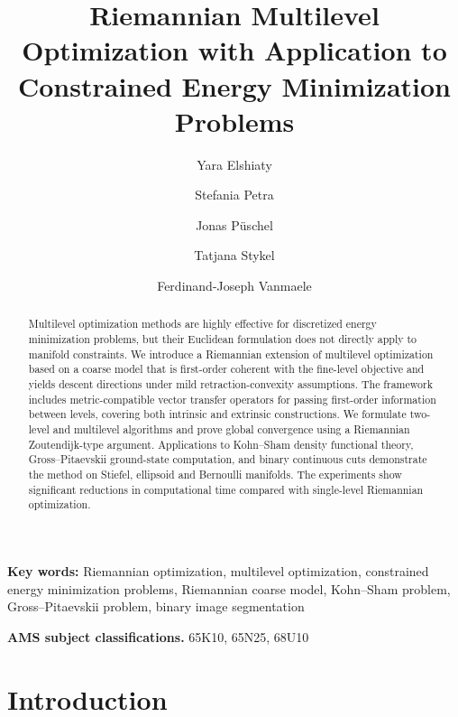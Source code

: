 \documentclass[11pt,reqno]{amsart}
\title[]{Riemannian Multilevel Optimization with Application to 
	Constrained Energy Minimization Problems}
\author[Y. Elshiaty]{Yara Elshiaty}
\author[S. Petra]{Stefania Petra}
\author[J. P\"uschel]{Jonas P\"uschel}
\author[T. Stykel]{Tatjana Stykel}
\author[F.-J. Vanmaele]{Ferdinand-Joseph Vanmaele}
\theoremstyle{plain}
\begin{document}
	
	\begin{abstract}
		Multilevel optimization methods are highly effective for discretized energy minimization problems, but their Euclidean formulation does not directly apply to manifold constraints. We introduce a Riemannian extension of multilevel optimization based on a  coarse model that is first-order coherent with the fine-level objective and yields descent directions under mild retraction-convexity assumptions. The framework includes metric-compatible vector transfer operators for passing first-order information between levels, covering both intrinsic and extrinsic constructions. We formulate two-level and multilevel algorithms and prove global convergence using a Riemannian Zoutendijk-type argument. Applications to Kohn--Sham density functional theory, Gross--Pitaevskii ground-state computation, and binary continuous cuts demonstrate the method on Stiefel, ellipsoid and Bernoulli manifolds. The experiments show significant reductions in computational time compared with single-level Riemannian optimization.
	\end{abstract}
	
	\maketitle
	
	{\tiny {\bf Key words:} 
		Riemannian optimization, multilevel optimization,
		constrained energy minimization problems, Riemannian coarse model, Kohn--Sham problem, Gross--Pitaevskii problem, binary image segmentation}
	
	{\tiny {\bf AMS subject classifications.} 
		65K10, %
		65N25, %
		68U10  %
	}
	
	
	\section{Introduction}
	\label{sec:introduction}
	
\end{document}
